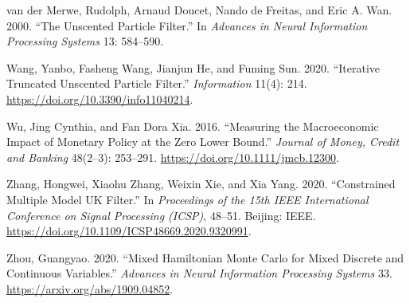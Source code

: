 \documentclass[11pt]{article}
\begin{document}
\begin{list}{}{\setlength{\leftmargin}{2em}\setlength{\itemindent}{-2em}\setlength{\itemsep}{2pt}\setlength{\parsep}{0pt}}
\item van der Merwe, Rudolph, Arnaud Doucet, Nando de Freitas, and Eric A. Wan. 2000. ``The Unscented Particle Filter.'' In \emph{Advances in Neural Information Processing Systems} 13: 584--590.

\item Wang, Yanbo, Fasheng Wang, Jianjun He, and Fuming Sun. 2020. ``Iterative Truncated Unscented Particle Filter.'' \emph{Information} 11(4): 214. \url{https://doi.org/10.3390/info11040214}.

\item Wu, Jing Cynthia, and Fan Dora Xia. 2016. ``Measuring the Macroeconomic Impact of Monetary Policy at the Zero Lower Bound.'' \emph{Journal of Money, Credit and Banking} 48(2--3): 253--291. \url{https://doi.org/10.1111/jmcb.12300}.

\item Zhang, Hongwei, Xiaohu Zhang, Weixin Xie, and Xia Yang. 2020. ``Constrained Multiple Model UK Filter.'' In \emph{Proceedings of the 15th IEEE International Conference on Signal Processing (ICSP)}, 48--51. Beijing: IEEE. \url{https://doi.org/10.1109/ICSP48669.2020.9320991}.

\item Zhou, Guangyao. 2020. ``Mixed Hamiltonian Monte Carlo for Mixed Discrete and Continuous Variables.'' \emph{Advances in Neural Information Processing Systems} 33. \url{https://arxiv.org/abs/1909.04852}.

\end{list}
\end{document}
